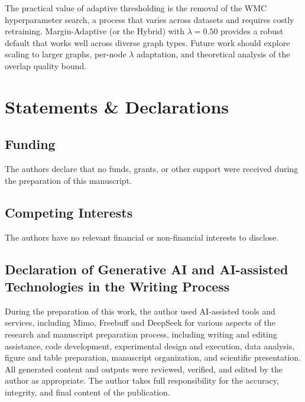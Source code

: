 \documentclass[pdflatex,sn-mathphys-num]{sn-jnl}%
\theoremstyle{thmstyleone}%
\theoremstyle{thmstyletwo}%
\theoremstyle{thmstylethree}%
\begin{document}
The practical value of adaptive thresholding is the removal of the WMC hyperparameter search, a process that varies across datasets and requires costly retraining. 
Margin-Adaptive (or the Hybrid) with $\lambda=0.50$ provides a robust default that works well across diverse graph types. 
Future work should explore scaling to larger graphs, per-node $\lambda$ adaptation, and theoretical analysis of the overlap quality bound.



\section*{Statements \& Declarations}

\subsection*{Funding}
The authors declare that no funds, grants, or other support were received during the preparation of this manuscript.

\subsection*{Competing Interests}
The authors have no relevant financial or non-financial interests to disclose.

\subsection*{Declaration of Generative AI and AI-assisted Technologies in the Writing Process}

During the preparation of this work, the author used AI-assisted tools and services, including Mimo, Freebuff and DeepSeek for various aspects of the research and manuscript preparation process, including writing and editing assistance, code development, experimental design and execution, data analysis, figure and table preparation, manuscript organization, and scientific presentation. All generated content and outputs were reviewed, verified, and edited by the author as appropriate. The author takes full responsibility for the accuracy, integrity, and final content of the publication.
\end{document}
